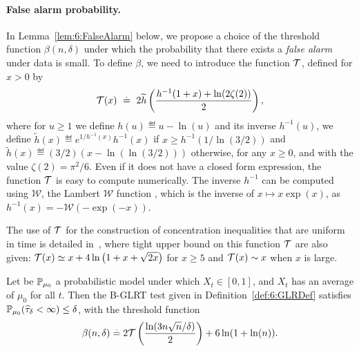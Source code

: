 \paragraph{False alarm probability.}\label{par:6:falseAlarm}
%
In Lemma~\ref{lem:6:FalseAlarm} below, we propose a choice of the threshold function $\beta(n,\delta)$ under which the probability that there exists a \emph{false alarm} under \iid{} data is small. To define $\beta$, we need to introduce the function $\mathcal{T}$, defined for $x>0$ by
%
\begin{equation}\label{def:6:function_T}
    \mathcal{T}(x) ~ \overset{.}{=} ~ 2 \widetilde{h}\left(\frac{h^{-1}(1+x) + \ln(2\zeta(2))}{2}\right),
\end{equation}
where for $u \ge 1$ we define $h(u) \eqdef u - \ln(u)$ and its inverse $h^{-1}(u)$,
%
we define $\widetilde{h}(x) \eqdef e^{1/h^{-1}(x)} h^{-1}(x)$ if $x \ge h^{-1}(1/\ln (3/2))$ and $\widetilde{h}(x) \eqdef (3/2) (x-\ln(\ln (3/2)))$ otherwise, for any $x \ge 0$,
and with the value $\zeta(2) = \pi^2 / 6$.
%
Even if it does not have a closed form expression, the function $\mathcal{T}$ is easy to compute numerically.
%
The inverse $h^{-1}$ can be computed using $\mathcal{W}$, the Lambert $\mathcal{W}$ function \cite{Corless96}, which is the inverse of $x \mapsto x \exp(x)$, as $h^{-1}(x) = - \mathcal{W}(- \exp(-x))$.

The use of $\mathcal{T}$ for the construction of concentration inequalities that are uniform in time is detailed in~\cite{KK18Martingales}, where tight upper bound on this function $\mathcal{T}$ are also given:
$\mathcal{T} (x) \simeq x + 4 \ln\big(1 + x + \sqrt{2x}\big)$ for $x\geq 5$ and $\mathcal{T}(x) \sim x$ when $x$ is large.

\begin{lemma}\label{lem:6:FalseAlarm}
\begin{leftbar}[lemmabar]  %
    Let be $\mathbb{P}_{\mu_0}$ a probabilistic model under which $X_t \in [0,1]$, and $X_t$ has an average of $\mu_0$ for all $t$.
    Then the B-GLRT test given in Definition~\ref{def:6:GLRDef} satisfies
    $\mathbb{P}_{\mu_0}(\widehat{\tau}_\delta < \infty) \leq \delta$, with the threshold function
    \begin{equation}\label{def:6:beta}
        \beta(n,\delta) \overset{.}{=} 2\mathcal{T}\left(\frac{\ln(3n\sqrt{n}/\delta)}{2}\right) + 6\ln(1+\ln(n)).
    \end{equation}
\end{leftbar}  %
\end{lemma}

